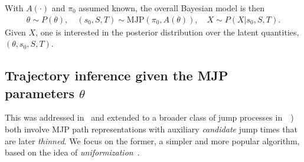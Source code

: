 With $A(\cdot)$ and $\pi_0$ assumed known, the overall Bayesian model is then 
\vspace{-.1in}
\begin{align}
  \label{eq:bayes_model}
  \theta \sim P(\theta), \quad (s_0, S, T) \sim \text{MJP}(\pi_0, A(\theta)), \quad X \sim P(X|s_0,S,T).
\end{align}
Given $X$, one is interested in the posterior distribution over the latent quantities, $(\theta,s_0, S, T)$. 

\vspace{-.1in}
\subsection{Trajectory inference given the MJP parameters $\theta$}
This was addressed in~\citet{RaoTeh13}  and extended to a broader class of jump processes in~\cite{RaoTeh12}~\citep[also see][]{FearnSher2006, Hobolth09, Elhaygibbssampling}) 
\citet{RaoTeh13,RaoTeh12} both involve MJP path representations with auxiliary {\em candidate} jump times that are later {\em thinned}.  
We focus on the former, a simpler and more popular algorithm, based on the idea of {\em uniformization}~\citep{Jen1953}. 

